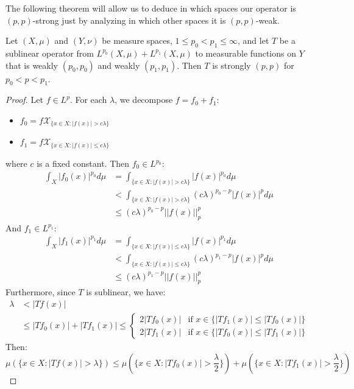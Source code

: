 The following theorem will allow us to deduce in which spaces our operator is $(p,p)$-strong just by analyzing in which other spaces it is $(p,p)$-weak.
\begin{theorem}{}
  Let $(X, \mu)$ and $(Y, \nu)$ be measure spaces, $1 \leq p_0 < p_1 \leq \infty$, and let $T$ be a sublinear operator from $L^{p_0}(X, \mu) + L^{p_1}(X, \mu)$ to measurable functions on $Y$ that is weakly $\left(p_0, p_0\right)$ and weakly $\left(p_1, p_1\right)$. Then $T$ is strongly $(p, p)$ for $p_0 < p < p_1$.
\end{theorem}
\begin{proof}{}
  Let $f \in L^p$. For each $\lambda$, we decompose $f = f_0 + f_1$:
  \begin{itemize}
    \item $f_0 = f \mathcal{X}_{\{ x \in X: |f(x)| > c\lambda \}}$\\
    \item $f_1 = f \mathcal{X}_{\{ x \in X: |f(x)| \leq c\lambda \}}$
  \end{itemize}
  where $c$ is a fixed constant.
  Then $f_0 \in L^{p_0}$:
  \begin{align*}
    \int_X |f_0(x)|^{p_0} d\mu & = \int_{\{ x \in X: |f(x)| > c\lambda \}} |f(x)|^{p_0} d\mu\\
    & < \int_{\{ x \in X: |f(x)| > c\lambda \}} (c\lambda)^{p_0 - p} |f(x)|^{p} d\mu\\
    & \leq (c\lambda)^{p_0 - p} ||f(x)||_p^p
  \end{align*}   
  And $f_1 \in L^{p_1}$:
  \begin{align*}
    \int_X |f_1(x)|^{p_1} d\mu & = \int_{\{ x \in X: |f(x)| \leq c\lambda \}} |f(x)|^{p_1} d\mu\\
    & < \int_{\{ x \in X: |f(x)| \leq c\lambda \}} (c\lambda)^{p_1 - p} |f(x)|^{p} d\mu\\
    & \leq (c\lambda)^{p_1 - p} ||f(x)||_p^p
  \end{align*}
  Furthermore, since $T$ is sublinear, we have:
  \begin{align*}
    \lambda & < |Tf(x)| \\
    & \leq |Tf_0(x)| + |Tf_1(x)| \leq \begin{cases}
      2|Tf_0(x)| & \text{if } x \in \{|Tf_1(x)| \leq |Tf_0(x)|\} \\
      2|Tf_1(x)| & \text{if } x \in \{|Tf_0(x)| \leq |Tf_1(x)|\}
    \end{cases}
  \end{align*}
  Then:
  $$\mu(\{x \in X: |Tf(x)| > \lambda\}) \leq \mu(\{x \in X: |Tf_0(x)| > \frac{\lambda}{2}\}) + \mu(\{x \in X: |Tf_1(x)| > \frac{\lambda}{2}\})$$

\end{proof}
